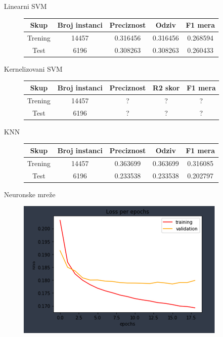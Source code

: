 \documentclass{beamer}
\begin{document}
\begin{frame}[fragile]{Linearni SVM}
    \begin{figure}[!h]
    \centering
    \begin{tabular}{ | c | c | c | c | c |}
        \hline
        Skup & Broj instanci & Preciznost & Odziv & F1 mera \\
        \hline
        Trening & 14457 & 0.316456 & 0.316456 & 0.268594 \\
        Test & 6196 & 0.308263 & 0.308263 & 0.260433 \\
        \hline
    \end{tabular}
    \end{figure}
\end{frame}

\begin{frame}[fragile]{Kernelizovani SVM}
    \begin{figure}[!h]
    \centering
    \begin{tabular}{ | c | c | c | c | c |}
        \hline
        Skup & Broj instanci & Preciznost & R2 skor & F1 mera \\
        \hline
        Trening & 14457 & ? & ? & ? \\
        Test & 6196 & ? & ? & ? \\
        \hline
    \end{tabular}
    \end{figure}
\end{frame}

\begin{frame}[fragile]{KNN}
    \begin{figure}[!h]
    \centering
    \begin{tabular}{ | c | c | c | c | c |}
        \hline
        Skup & Broj instanci & Preciznost & Odziv & F1 mera \\
        \hline
        Trening & 14457 & 0.363699 & 0.363699 & 0.316085 \\
        Test & 6196 & 0.233538 & 0.233538 & 0.202797 \\
        \hline
    \end{tabular}
    \end{figure}
\end{frame}

\begin{frame}[fragile]{Neuronske mre\v{z}e}
    \begin{figure}[!h]
    \centering
    \includegraphics[scale=0.9]{loss.PNG}
    \end{figure}
\end{frame}
\end{document}
